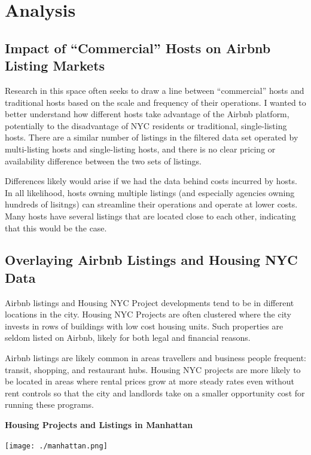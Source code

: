 \documentclass[12pt]{article}
\begin{document}
\section{Analysis}

\subsection{Impact of ``Commercial'' Hosts on Airbnb Listing Markets}

Research in this space often seeks to draw a line between ``commercial'' hosts and traditional hosts based on the scale and frequency of their operations. I wanted to better understand how different hosts take advantage of the Airbnb platform, potentially to the disadvantage of NYC residents or traditional, single-listing hosts. There are a similar number of listings in the filtered data set operated by multi-listing hosts and single-listing hosts, and there is no clear pricing or availability difference between the two sets of listings.

Differences likely would arise if we had the data behind costs incurred by hosts. In all likelihood, hosts owning multiple listings (and especially agencies owning hundreds of lisitngs) can streamline their operations and operate at lower costs. Many hosts have several listings that are located close to each other, indicating that this would be the case.

\subsection{Overlaying Airbnb Listings and Housing NYC Data}

Airbnb listings and Housing NYC Project developments tend to be in different locations in the city. Housing NYC Projects are often clustered where the city invests in rows of buildings with low cost housing units. Such properties are seldom listed on Airbnb, likely for both legal and financial reasons.

Airbnb listings are likely common in areas travellers and business people frequent: transit, shopping, and restaurant hubs. Housing NYC projects are more likely to be located in areas where rental prices grow at more steady rates even without rent controls so that the city and landlords take on a smaller opportunity cost for running these programs.

\newpage

\begin{center}
  \textbf{Housing Projects and Listings in Manhattan}

  \texttt{[image: ./manhattan.png]}
\end{center}
\end{document}
